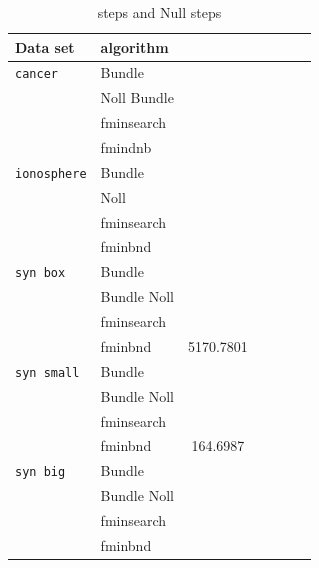 \begin{center}
\begin{table}[H]%
	\begin{tabular}{llccccc}
		\hline
    Data set & algorithm &  \\
		\hline
		\texttt{cancer} & Bundle & \\
		 & Noll Bundle &   \\
		 &  fminsearch & \\
		 & fmindnb & \\
		\texttt{ionosphere} & Bundle &  \\
		 & Noll &  \\
		 & fminsearch &\\
		 & fminbnd &  \\
		\texttt{syn box} & Bundle & \\
		 & Bundle Noll &   \\
		 & fminsearch &\\
		 & fminbnd & 5170.7801\\
		\texttt{syn small} & Bundle & \\
		 & Bundle Noll &  \\
		 & fminsearch &  \\
		 & fminbnd & 164.6987 \\
		\texttt{syn big} & Bundle &  \\
		 & Bundle Noll & \\
		 & fminsearch &   \\
		 & fminbnd &   \\
	\end{tabular}
	\caption{steps and Null steps}
\end{table}
\end{center}


%
%
%
%
%

